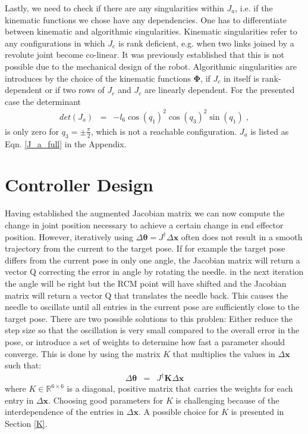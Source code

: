 Lastly, we need to check if there are any singularities within $J_a$, i.e. if the kinematic functions we chose have any dependencies. One has to differentiate between kinematic and algorithmic singularities. Kinematic singularities refer to any configurations in which $J_e$ is rank deficient, e.g. when two links joined by a revolute joint become co-linear. It was previously established that this is not possible due to the mechanical design of the robot. Algorithmic singularities are introduces by the choice of the kinematic functions $\bm{\Phi}$, if $J_c$ in itself is rank-dependent or if two rows of $J_e $ and $J_c$ are linearly dependent. For the presented case the determinant
\begin{eqnarray}
	det(J_a) &=&	-l_6\cos(q_1)^2\cos(q_3)^2\sin(q_1) \; ,
\end{eqnarray}
is only zero for $q_3 = \pm\frac{\pi}{2}$, which is not a reachable configuration. $J_a$ is listed as Eqn. \ref{J_a_full} in the Appendix.\\

\section{Controller Design}

Having established the augmented Jacobian matrix we can now compute the change in joint position necessary to achieve a certain change in end effector position. However, iteratively using $\Delta \bm{\theta}=J^{\dagger}\Delta \bm{x}$ often does not result in a smooth trajectory from the current to the target pose. If for example the target pose differs from the current pose in only one angle, the Jacobian matrix will return a vector Q correcting the error in angle by rotating the needle. in the next iteration the angle will be right but the RCM point will have shifted and the Jacobian matrix will return a vector Q that translates the needle back. This causes the needle to oscillate until all entries in the current pose are sufficiently close to the target pose. There are two possible solutions to this problen: Either reduce the step size so that the oscillation is very small compared to the overall error in the pose, or introduce a set of weights to determine how fast a parameter should converge. This is done by using the matrix $K$ that multiplies the values in $\Delta \bm{x}$ such that:
\begin{eqnarray}\label{K_J}
	\Delta \bm{\theta}&=&J^{\dagger}\bm{K}\Delta \bm{x}
\end{eqnarray}
where $K \in \mathbb{R}^{6\times6}$ is a diagonal, positive matrix that carries the weights for each entry in $\Delta\bm{x}$. 
Choosing good parameters for $K$ is challenging because of the interdependence of the entries in  $\Delta \bm{x}$. A possible choice for $K$ is presented in Section \ref{K}.

